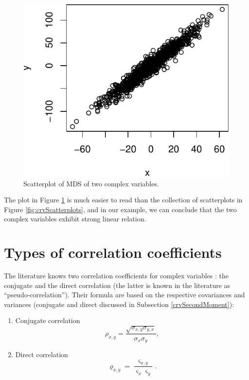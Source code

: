 \documentclass[
]{book}
\begin{document}
\begin{figure}
\centering
\includegraphics{Svetunkov---Svetunkov---Complex-Valued-Econometrics_files/figure-latex/crvScatterplotMDS-1.pdf}
\caption{\label{fig:crvScatterplotMDS}Scatterplot of MDS of two complex variables.}
\end{figure}

The plot in Figure \ref{fig:crvScatterplotMDS} is much easier to read than the collection of scatterplots in Figure \ref{fig:crvScatterplots}, and in our example, we can conclude that the two complex variables exhibit strong linear relation.

\hypertarget{types-of-correlation-coefficients}{%
\section{Types of correlation coefficients}\label{types-of-correlation-coefficients}}

The literature knows two correlation coefficients for complex variables \citep{ref}: the conjugate and the direct correlation (the latter is known in the literature as ``pseudo-correlation''). Their formula are based on the respective covariances and variances (conjugate and direct discussed in Subsection \ref{crvSecondMoment}):

\begin{enumerate}
\def\labelenumi{\arabic{enumi}.}
\item
  Conjugate correlation
  \begin{equation}
   \rho_{x,y} = \frac{\sqrt{\sigma_{x,y} \sigma_{y,x}}}{\sigma_x \sigma_y},
   \label{eq:correlationConventional}
  \end{equation}
\item
  Direct correlation
  \begin{equation}
   \varrho_{x,y} = \frac{\varsigma_{x,y}}{\varsigma_x \varsigma_y}.
   \label{eq:correlationPseudo}
  \end{equation}
\end{enumerate}
\end{document}
